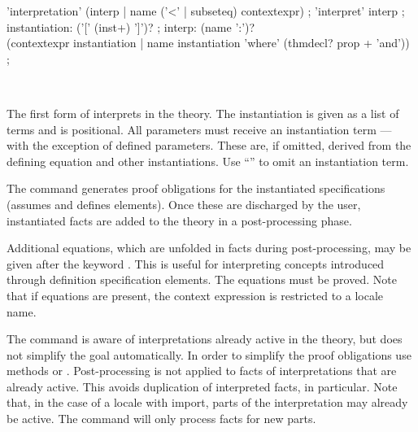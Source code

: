 \begin{isabellebody}
\begin{isamarkuptext}
  \begin{rail}
    'interpretation' (interp | name ('<' | subseteq) contextexpr)
    ;
    'interpret' interp
    ;
    instantiation: ('[' (inst+) ']')?
    ;
    interp: (name ':')? \\ (contextexpr instantiation |
      name instantiation 'where' (thmdecl? prop + 'and'))
    ;
  \end{rail}

  \begin{description}

  \item \hyperlink{command.interpretation}{\mbox{}}~

  The first form of \hyperlink{command.interpretation}{\mbox{}} interprets  in the theory.  The instantiation is given as a list of terms
   and is positional.  All parameters must receive an
  instantiation term --- with the exception of defined parameters.
  These are, if omitted, derived from the defining equation and other
  instantiations.  Use ``\isa{{\isacharunderscore}}'' to omit an instantiation term.

  The command generates proof obligations for the instantiated
  specifications (assumes and defines elements).  Once these are
  discharged by the user, instantiated facts are added to the theory
  in a post-processing phase.

  Additional equations, which are unfolded in facts during
  post-processing, may be given after the keyword \hyperlink{keyword.where}{\mbox{}}.
  This is useful for interpreting concepts introduced through
  definition specification elements.  The equations must be proved.
  Note that if equations are present, the context expression is
  restricted to a locale name.

  The command is aware of interpretations already active in the
  theory, but does not simplify the goal automatically.  In order to
  simplify the proof obligations use methods \hyperlink{method.intro-locales}{\mbox{}}
  or \hyperlink{method.unfold-locales}{\mbox{}}.  Post-processing is not applied to
  facts of interpretations that are already active.  This avoids
  duplication of interpreted facts, in particular.  Note that, in the
  case of a locale with import, parts of the interpretation may
  already be active.  The command will only process facts for new
  parts.


\end{description}
\end{isamarkuptext}
\end{isabellebody}
